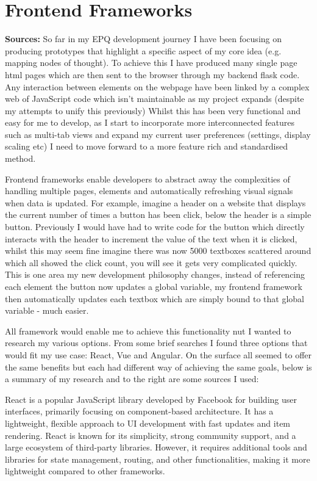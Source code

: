 \section{Frontend Frameworks}
\label{research:FrontendFramework}
\textbf{Sources:} \cite{AngularVsReact} \cite{AngularVsReact2021} \cite{ComparisonOtherFrameworks}
So far in my EPQ development journey I have been focusing on producing prototypes that highlight a specific aspect of my core idea (e.g. mapping nodes of thought). To achieve this I have produced many single page html pages which are then sent to the browser through my backend flask code. Any interaction between elements on the webpage have been linked by a complex web of JavaScript code which isn't maintainable as my project expands (despite my attempts to unify this previously) Whilst this has been very functional and easy for me to develop, as I start to incorporate more interconnected features such as multi-tab views and expand my current user preferences (settings, display scaling etc) I need to move forward to a more feature rich and standardised method.

Frontend frameworks enable developers to abstract away the complexities of handling multiple pages, elements and automatically refreshing visual signals when data is updated. For example, imagine a header on a website that displays the current number of times a button has been click, below the header is a simple button. Previously I would have had to write code for the button which directly interacts with the header to increment the value of the text when it is clicked, whilst this may seem fine imagine there was now 5000 textboxes scattered around which all showed the click count, you will see it gets very complicated quickly. This is one area my new development philosophy changes, instead of referencing each element the button now updates a global variable, my frontend framework then automatically updates each textbox which are simply bound to that global variable - much easier.


All framework would enable me to achieve this functionality nut I wanted to research my various options. From some brief searches I found three options that would fit my use case: React, Vue and Angular. On the surface all seemed to offer the same benefits but each had different way of achieving the same goals, below is a summary of my research and to the right are some sources I used:

React is a popular JavaScript library developed by Facebook for building user interfaces, primarily focusing on component-based architecture. It has a lightweight, flexible approach to UI development with fast updates and item rendering. React is known for its simplicity, strong community support, and a large ecosystem of third-party libraries. However, it requires additional tools and libraries for state management, routing, and other functionalities, making it more lightweight compared to other frameworks.

